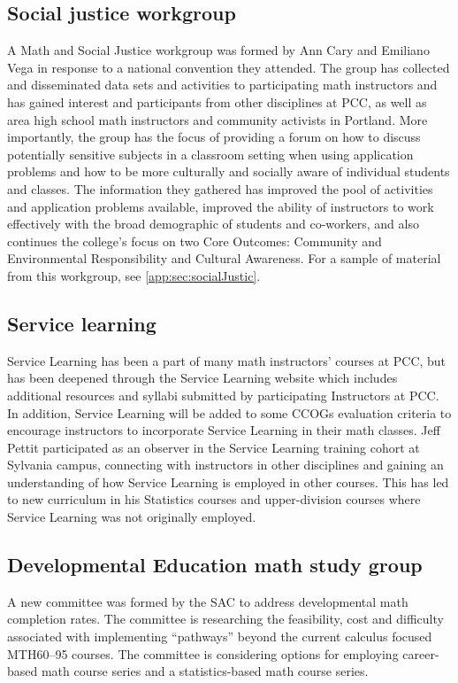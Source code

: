 \subsection{Social justice workgroup}\label{cur:sub:socialJustic}
A Math and Social Justice workgroup was formed by Ann Cary and Emiliano Vega in
response to a national convention they attended. The group has collected and
disseminated data sets and activities to participating math instructors and has
gained interest and participants from other disciplines at PCC, as well as area
high school math instructors and community activists in Portland. More
importantly, the group has the focus of providing a forum on how to discuss
potentially sensitive subjects in a classroom setting when using application
problems and how to be more culturally and socially aware of individual students
and classes. The information they gathered has improved the pool of activities and application problems
available, improved the ability of instructors to work effectively with the
broad demographic of students and co-workers, and also continues the college's
focus on two Core Outcomes: Community and Environmental Responsibility and
Cultural Awareness. For a sample of material from this workgroup, see
\vref{app:sec:socialJustic}.

\subsection{Service learning}\label{other:sec:servicelearning}
Service Learning has been a part of many math instructors' courses at PCC, but
has been deepened through the Service Learning website
which includes additional resources and syllabi submitted
by participating Instructors at PCC. In addition, Service Learning will be
added to some CCOGs evaluation criteria to encourage instructors to incorporate
Service Learning in their math classes. Jeff Pettit participated as
an observer in the Service Learning training cohort at Sylvania campus,
connecting with instructors in other disciplines and gaining an understanding of
how Service Learning is employed in other courses. This has led to new curriculum in his
Statistics courses and upper-division courses where Service Learning was not
originally employed.

\subsection{Developmental Education math study group}
A new committee was formed by the SAC to address developmental math completion
rates. The committee is researching the feasibility, cost and difficulty
associated with implementing ``pathways'' beyond the current calculus focused
MTH60--95 courses. The committee is considering options for employing
career-based math course series and a statistics-based math course series.

